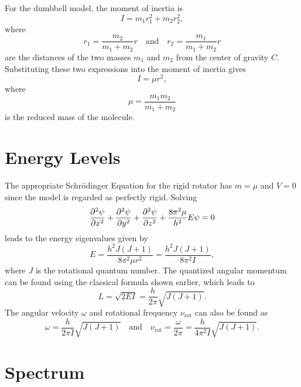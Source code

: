 \documentclass[11pt, twoside, fleqn]{report}
\newcommand{\up}{\text}
\begin{document}
For the dumbbell model, the moment of inertia is
\begin{equation*}
    I = m_1r_1^2 + m_2r_2^2,
\end{equation*}
where
\begin{equation*}
    r_1 = \frac{m_2}{m_1 + m_2}r \quad\text{and}\quad r_2 = \frac{m_1}{m_1 + m_2}r
\end{equation*}
are the distances of the two masses $m_1$ and $m_2$ from the center of gravity $C$. Substituting these two expressions into the moment of inertia gives
\begin{equation*}
    I = \mu r^2,
\end{equation*}
where
\begin{equation*}
    \mu = \frac{m_1m_2}{m_1 + m_2}
\end{equation*}
is the reduced mass of the molecule.

\section{Energy Levels}
\label{s:energy_levels_1}

The appropriate Schr\"odinger Equation for the rigid rotator has $m = \mu$ and $V = 0$ since the model is regarded as perfectly rigid. Solving
\begin{equation*}
    \pdv[2]{\psi}{x} + \pdv[2]{\psi}{y} + \pdv[2]{\psi}{z} + \frac{8\pi^2\mu}{h^2}E\psi = 0
\end{equation*}
leads to the energy eigenvalues given by
\begin{equation*}
    E = \frac{h^2J(J + 1)}{8\pi^2\mu r^2} = \frac{h^2J(J + 1)}{8\pi^2I},
\end{equation*}
where $J$ is the rotational quantum number. The quantized angular momentum can be found using the classical formula shown earlier, which leads to
\begin{equation*}
    L = \sqrt{2EI} = \frac{h}{2\pi}\sqrt{J(J + 1)}.
\end{equation*}
The angular velocity $\omega$ and rotational frequency $\nu_\up{rot}$ can also be found as
\begin{equation*}
    \omega = \frac{h}{2\pi I}\sqrt{J(J + 1)} \quad\text{and}\quad \nu_\up{rot} = \frac{\omega}{2\pi} = \frac{h}{4\pi^2I}\sqrt{J(J + 1)}.
\end{equation*}

\section{Spectrum}
\label{s:spectrum_1}
\end{document}
